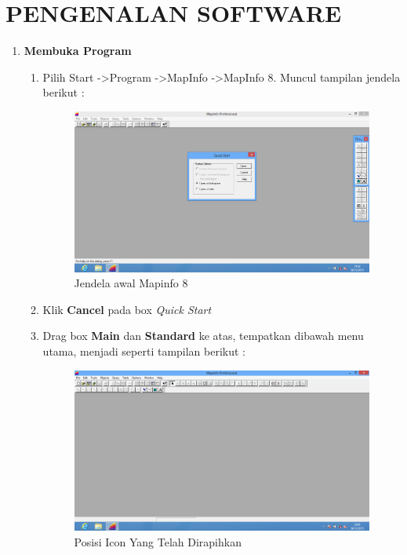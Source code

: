 \chapter{PENGENALAN SOFTWARE}

\begin{enumerate}[\bfseries A.]

  \item \textbf{Membuka Program}
  
  \begin{enumerate}[1.]
  
    \item Pilih Start -\textgreater Program -\textgreater MapInfo -\textgreater MapInfo 8. Muncul tampilan jendela berikut :
    
    \begin{figure}[H]
      \centering
      \includegraphics[width=1\textwidth]{./resources/000-start-mapinfo8}
      \caption{Jendela awal Mapinfo 8}
    \end{figure}
    
    \item Klik \textbf{Cancel} pada box \textit{Quick Start}
    
    \item Drag box \textbf{Main} dan \textbf{Standard} ke atas, tempatkan dibawah menu utama, menjadi seperti tampilan berikut :
  
    \begin{figure}[H]  
      \centering
      \includegraphics[width=1\textwidth]{./resources/001-rapih-icon}
      \caption{Posisi Icon Yang Telah Dirapihkan}
    \end{figure}
  

\end{enumerate}
\end{enumerate}

